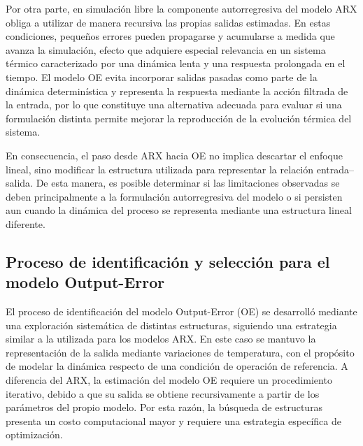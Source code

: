 \documentclass[11pt]{report}
\begin{document}
Por otra parte, en simulación libre la componente autorregresiva del modelo ARX obliga a utilizar de manera recursiva las propias salidas estimadas. En estas condiciones, pequeños errores pueden propagarse y acumularse a medida que avanza la simulación, efecto que adquiere especial relevancia en un sistema térmico caracterizado por una dinámica lenta y una respuesta prolongada en el tiempo. El modelo OE evita incorporar salidas pasadas como parte de la dinámica determinística y representa la respuesta mediante la acción filtrada de la entrada, por lo que constituye una alternativa adecuada para evaluar si una formulación distinta permite mejorar la reproducción de la evolución térmica del sistema.

En consecuencia, el paso desde ARX hacia OE no implica descartar el enfoque lineal, sino modificar la estructura utilizada para representar la relación entrada–salida. De esta manera, es posible determinar si las limitaciones observadas se deben principalmente a la formulación autorregresiva del modelo o si persisten aun cuando la dinámica del proceso se representa mediante una estructura lineal diferente.

\subsection{Proceso de identificación y selección para el modelo Output-Error}


El proceso de identificación del modelo Output-Error (OE) se desarrolló mediante una exploración sistemática de distintas estructuras, siguiendo una estrategia similar a la utilizada para los modelos ARX. En este caso se mantuvo la representación de la salida mediante variaciones de temperatura, con el propósito de modelar la dinámica respecto de una condición de operación de referencia. A diferencia del ARX, la estimación del modelo OE requiere un procedimiento iterativo, debido a que su salida se obtiene recursivamente a partir de los parámetros del propio modelo. Por esta razón, la búsqueda de estructuras presenta un costo computacional mayor y requiere una estrategia específica de optimización.
\end{document}
